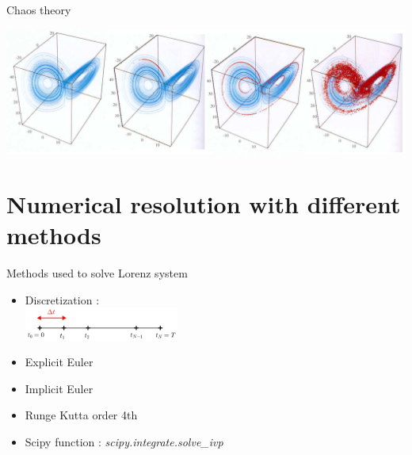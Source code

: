 \documentclass[10pt,xcolor={table,dvipsnames},t]{beamer}
\begin{document}
	\begin{frame}{Chaos theory}
		
		\begin{center}
			\begin{minipage}[c]{.99\linewidth}
				\centering
				\includegraphics[width=\linewidth]{images/chaos.png}
			\end{minipage}
		\end{center}
		
	\end{frame}
	
	\section{Numerical resolution with different methods}
	
	\begin{frame}{Methods used to solve Lorenz system}
		
		\begin{itemize}
			\item Discretization : \\
			\qquad \includegraphics[width=0.4\textwidth]{images/discretization.jpg} \\
			\item Explicit Euler
			\item Implicit Euler			
			\item Runge Kutta order 4th			
			\item Scipy function : \qquad \textit{scipy.integrate.solve\_ivp}
		\end{itemize}
		
	\end{frame}
	
\end{document}
